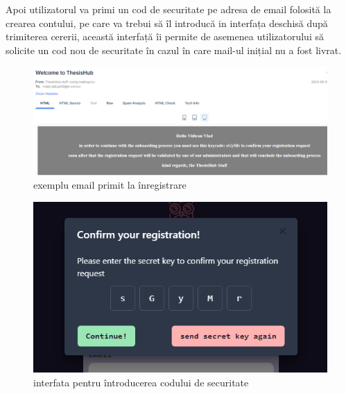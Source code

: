 \documentclass[12pt,a4paper,hidelinks]{report}
\theoremstyle{definition}
\theoremstyle{remark}
\begin{document}
Apoi utilizatorul va primi un cod de securitate pe adresa de email  folosită la crearea contului, pe care va trebui să îl introducă
in interfața deschisă după trimiterea cererii, această interfață îi permite de asemenea utilizatorului să solicite un cod nou de securitate
în cazul în care mail-ul inițial nu a fost livrat.
\begin{figure}[H]
    \centering
    \includegraphics[scale=0.5]{images/RegisterEmail.png}
    \caption{exemplu email primit la înregistrare}
\end{figure}
\begin{figure}[H]
    \centering
    \includegraphics[scale=0.5]{images/SecurityKey.png}
    \caption{interfata pentru întroducerea codului de securitate}
\end{figure}
\end{document}
